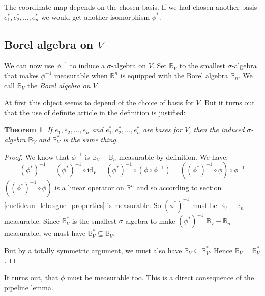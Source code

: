 \documentclass[12pt, a4paper]{article}
\newtheorem{theorem}{Theorem}[section]
\numberwithin{equation}{section}
\begin{document}
The coordinate map depends on the chosen basis. If we had chosen another basis $e^*_1,e^*_2,\ldots,e^*_n$ we would get another isomorphism $\phi^*$.

\subsection{Borel algebra on $V$}
We can now use $\phi^{-1}$ to induce a $\sigma$-algebra on $V$. Set $\mathbb{B}_V$ to the smallest $\sigma$-algebra that makes $\phi^{-1}$ measurable when $\mathbb{R}^n$ is equipped with the Borel algebra $\mathbb{B}_n$. We call $\mathbb{B}_V$ the \textit{Borel algebra on $V$}.

At first this object seems to depend of the choice of basis for $V$. But it turns out that the use of definite article in the definition is justified:
\begin{theorem}
If $e_1,e_2,\ldots,e_n$ and $e^*_1,e^*_2,\ldots,e^*_n$ are bases for $V$, then the induced $\sigma$-algebra $\mathbb{B}_V$ and $\mathbb{B}^*_V$ is the same thing.
\end{theorem}
\begin{proof}
We know that $\phi^{-1}$ is $\mathbb{B}_V-\mathbb{B}_n$ measurable by definition. We have:
\begin{equation}
(\phi^*)^{-1}=(\phi^*)^{-1}\circ\textrm{id}_V=(\phi^*)^{-1}\circ(\phi\circ\phi^{-1})=\left((\phi^*)^{-1}\circ\phi\right)\circ\phi^{-1}
\end{equation}
$\left((\phi^*)^{-1}\circ\phi\right)$ is a linear operator on $\mathbb{R}^n$ and so according to section \ref{euclidean_lebesgue_properties} is measurable. So $(\phi^*)^{-1}$ must be $\mathbb{B}_V-\mathbb{B}_n$-measurable. Since $\mathbb{B}_V^*$ is the smallest $\sigma$-algebra to make $(\phi^*)^{-1}$ $\mathbb{B}_V-\mathbb{B}_n$-measurable, we must have $\mathbb{B}^*_V\subseteq\mathbb{B}_V$.

But by a totally symmetric argument, we must also have $\mathbb{B}_V\subseteq\mathbb{B}^*_V$. Hence $\mathbb{B}_V=\mathbb{B}^*_V$.
\end{proof}

It turns out, that $\phi$ must be measurable too. This is a direct consequence of the pipeline lemma.
\end{document}
